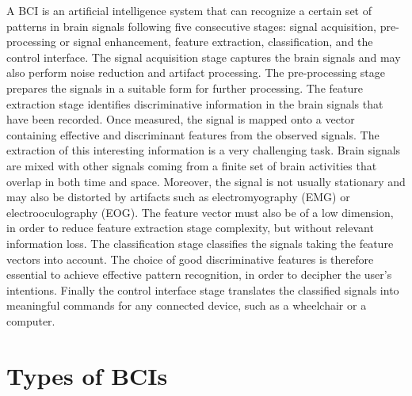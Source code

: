 A BCI is an artificial intelligence system that can recognize a certain set of patterns in brain signals following five consecutive stages: signal acquisition, pre-processing or signal enhancement, feature extraction, classification, and the control interface. The signal acquisition stage captures the brain signals and may also perform noise reduction and artifact processing. The pre-processing stage prepares the signals in a suitable form for further processing. The feature extraction stage identifies discriminative information in the brain signals that have been recorded. Once measured, the signal is mapped onto a vector containing effective and discriminant features from the observed signals. The extraction of this interesting information is a very challenging task. Brain signals are mixed with other signals coming from a finite set of brain activities that overlap in both time and space. Moreover, the signal is not usually stationary and may also be distorted by artifacts such as electromyography (EMG) or electrooculography (EOG). The feature vector must also be of a low dimension, in order to reduce feature extraction stage complexity, but without relevant information loss. The classification stage classifies the signals taking the feature vectors into account. The choice of good discriminative features is therefore essential to achieve effective pattern recognition, in order to decipher the user's intentions. Finally the control interface stage translates the classified signals into meaningful commands for any connected device, such as a wheelchair or a computer.


\section{Types of BCIs}\label{ch2:3}
  
